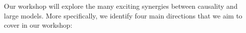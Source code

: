 \documentclass{article}
\begin{document}
Our workshop will explore the many exciting synergies between causality and large models. 
More specifically, we identify four main directions that we aim to cover in our workshop: 

\end{document}
